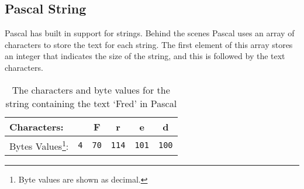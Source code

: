 \clearpage
\subsection{Pascal String} %
\label{sub:pas_string}

Pascal has built in support for strings. Behind the scenes Pascal uses an array of characters to store the text for each string. The first element of this array stores an integer that indicates the size of the string, and this is followed by the text characters.

\begin{table}[h]
\begin{minipage}{\textwidth}
  \centering
\begin{tabular}{|l|c|c|c|c|c|}
\hline
Characters: & & F & r & e & d  \\
\hline
Bytes Values\footnote{Byte values are shown as decimal.}: & \texttt{4} & \texttt{70} & \texttt{114} & \texttt{101} & \texttt{100} \\
\hline
\end{tabular}
\caption{The characters and byte values for the string containing the text `Fred' in Pascal}
\label{tbl:pas-string-fred}
\end{minipage}
\end{table}



